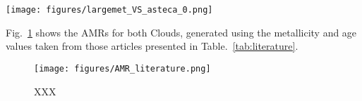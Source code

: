 \documentclass[a4paper,fleqn,usenatbib]{mnras}
\begin{document}
\begin{figure*}
\texttt{[image: figures/largemet\_VS\_asteca\_0.png]}
\caption{CMDs for the OCs that cause a peak in the AMR for the LMC, for ages
close to 4 Gyr.
The best match synthetic cluster is plotted to the right, and the observed
cluster region CMD to the left, for each OC.}
\label{fig:largemet}
\end{figure*}

Fig.~\ref{fig:amr_lit} shows the AMRs for both Clouds, generated using the
metallicity and age values taken from those articles presented in
Table.~\ref{tab:literature}.

\begin{figure}
\texttt{[image: figures/AMR\_literature.png]}
\caption{XXX}
\label{fig:amr_lit}
\end{figure}



\bsp	%
\label{lastpage}
\end{document}
